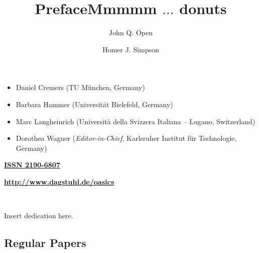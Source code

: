 \documentclass[a4paper,UKenglish]{oasicsmaster-v2016}
\begin{document}
\begin{publicationinfo}
\begin{itemize}
\item Daniel Cremers (TU M\"unchen, Germany)
\item Barbara Hammer (Universit\"at Bielefeld, Germany)
\item Marc Langheinrich (Universit\`a della Svizzera Italiana -- Lugano, Switzerland)
\item Dorothea Wagner (\emph{Editor-in-Chief}, Karlsruher Institut f\"{u}r Technologie, Germany)
 \end{itemize}
 
\bigskip
\bigskip
\bigskip

{\large\bf\sffamily \href{http://www.dagstuhl.de/dagpub/2190-6807}{ISSN 2190-6807}}

\bigskip
\bigskip
\bigskip

{\Large\bf\sffamily \href{http://www.dagstuhl.de/oasics}{http://www.dagstuhl.de/oasics}}
 
\vfill

 
\newpage
 
\thispagestyle{empty}

\ \\

\end{publicationinfo}


\begin{dedication}%
  Insert dedication here.
\end{dedication}


\begin{contentslist}

\contitem
\title{Preface}
\author{John Q. Open}

\part{Regular Papers}

\contitem
\title{Mmmmm $\ldots$ donuts}
\author{Homer J. Simpson}


\end{contentslist}
\end{document}
